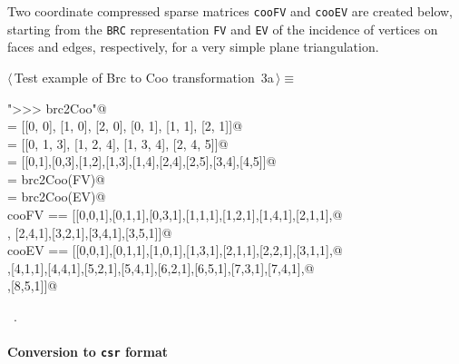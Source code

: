 \documentclass[11pt,oneside]{article}    %
\begin{document}
Two coordinate compressed sparse matrices \texttt{cooFV} and \texttt{cooEV} are created below, starting from the \texttt{BRC} representation \texttt{FV} and \texttt{EV} of the incidence of vertices on faces and edges, respectively, for a very simple plane triangulation.
\begin{flushleft} \small \label{scrap2}
\protect{}$\langle\,$Test example of Brc to Coo transformation\nobreak\ {\footnotesize 3a}$\,\rangle\equiv$
\vspace{-1ex}
\begin{list}{}{} \item
\mbox{}\verb@print "\n>>> brc2Coo"@\\
\mbox{}\verb@V = [[0, 0], [1, 0], [2, 0], [0, 1], [1, 1], [2, 1]]@\\
\mbox{}\verb@FV = [[0, 1, 3], [1, 2, 4], [1, 3, 4], [2, 4, 5]]@\\
\mbox{}\verb@EV = [[0,1],[0,3],[1,2],[1,3],[1,4],[2,4],[2,5],[3,4],[4,5]]@\\
\mbox{}\verb@cooFV = brc2Coo(FV)@\\
\mbox{}\verb@cooEV = brc2Coo(EV)@\\
\mbox{}\verb@assert cooFV == [[0,0,1],[0,1,1],[0,3,1],[1,1,1],[1,2,1],[1,4,1],[2,1,1],@\\
\mbox{}\verb@[2,3,1], [2,4,1],[3,2,1],[3,4,1],[3,5,1]]@\\
\mbox{}\verb@assert cooEV == [[0,0,1],[0,1,1],[1,0,1],[1,3,1],[2,1,1],[2,2,1],[3,1,1],@\\
\mbox{}\verb@[3,3,1],[4,1,1],[4,4,1],[5,2,1],[5,4,1],[6,2,1],[6,5,1],[7,3,1],[7,4,1],@\\
\mbox{}\verb@[8,4,1],[8,5,1]]@\\
\mbox{}\verb@@{\NWsep}
\end{list}
\vspace{-1ex}
\footnotesize\addtolength{\baselineskip}{-1ex}
\begin{list}{}{\setlength{\itemsep}{-\parsep}\setlength{\itemindent}{-\leftmargin}}
\item \NWtxtMacroRefIn\ .
\end{list}
\end{flushleft}
\paragraph{Conversion to \texttt{csr} format}
\end{document}
